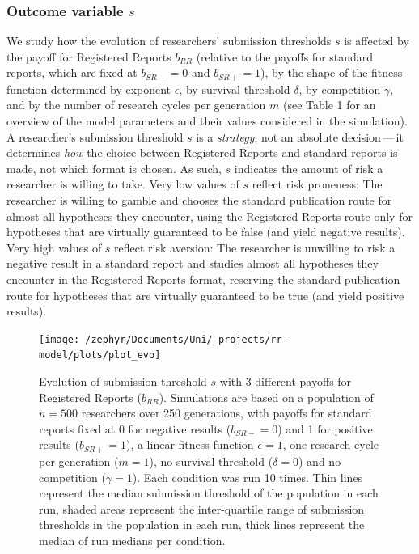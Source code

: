 \documentclass[british,,man,mask,floatsintext]{apa6}
\begin{document}
\hypertarget{outcome-variable-s}{%
\subsubsection{\texorpdfstring{Outcome variable \(s\)}{Outcome variable s}}\label{outcome-variable-s}}

We study how the evolution of researchers' submission thresholds \(s\) is affected by the payoff for Registered Reports \(b_{RR}\) (relative to the payoffs for standard reports, which are fixed at \(b_{SR-} = 0\) and \(b_{SR+} = 1\)), by the shape of the fitness function determined by exponent \(\epsilon\), by survival threshold \(\delta\), by competition \(\gamma\), and by the number of research cycles per generation \(m\) (see Table 1 for an overview of the model parameters and their values considered in the simulation).
A researcher's submission threshold \(s\) is a \emph{strategy}, not an absolute decision\(\,\)---\(\,\)it determines \emph{how} the choice between Registered Reports and standard reports is made, not which format is chosen.
As such, \(s\) indicates the amount of risk a researcher is willing to take.
Very low values of \(s\) reflect risk proneness:
The researcher is willing to gamble and chooses the standard publication route for almost all hypotheses they encounter, using the Registered Reports route only for hypotheses that are virtually guaranteed to be false (and yield negative results).
Very high values of \(s\) reflect risk aversion:
The researcher is unwilling to risk a negative result in a standard report and studies almost all hypotheses they encounter in the Registered Reports format, reserving the standard publication route for hypotheses that are virtually guaranteed to be true (and yield positive results).



\begin{figure}

{\centering \texttt{[image: /zephyr/Documents/Uni/\_projects/rr-model/plots/plot\_evo]} 

}

\caption{Evolution of submission threshold \(s\) with 3 different payoffs for Registered Reports (\(b_{RR}\)). Simulations are based on a population of \(n = 500\) researchers over 250 generations, with payoffs for standard reports fixed at 0 for negative results (\(b_{SR-} = 0\)) and 1 for positive results (\(b_{SR+} = 1\)), a linear fitness function \(\epsilon = 1\), one research cycle per generation (\(m = 1\)), no survival threshold (\(\delta = 0\)) and no competition (\(\gamma = 1\)). Each condition was run 10 times. Thin lines represent the median submission threshold of the population in each run, shaded areas represent the inter-quartile range of submission thresholds in the population in each run, thick lines represent the median of run medians per condition.}\label{fig:evoplot}
\end{figure}
\end{document}
